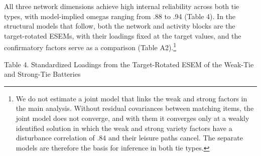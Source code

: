\documentclass[
  12pt
]{article}
\begin{document}
All three network dimensions achieve high internal reliability across both tie types, with model-implied omegas ranging from .88 to .94 (Table 4). In the structural models that follow, both the network and activity blocks are the target-rotated ESEMs, with their loadings fixed at the target values, and the confirmatory factors serve as a comparison (Table A2).\footnote{We do not estimate a joint model that links the weak and strong factors in the main analysis. Without residual covariances between matching items, the joint model does not converge, and with them it converges only at a weakly identified solution in which the weak and strong variety factors have a disturbance correlation of .84 and their leisure paths cancel. The separate models are therefore the basis for inference in both tie types.}

Table 4. Standardized Loadings from the Target-Rotated ESEM of the Weak-Tie and Strong-Tie Batteries
\end{document}
